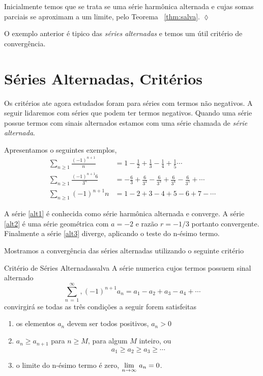 Inicialmente temos que se trata se uma s\'{e}rie harm\^{o}nica alternada e
cujas somas parciais se aproximam a um limite, pelo Teorema
~\ref{thm:salva}. \hfill \(\lozenge\)


O exemplo anterior \'{e} tipico das \textit{s\'{e}ries alternadas} e temos
um \'{u}til crit\'{e}rio de  converg\^{e}ncia.

\section{S\'{e}ries Alternadas, Crit\'{e}rios}

Os crit\'{e}rios ate agora estudados foram para s\'{e}ries com termos n\~{a}o
negativos. A seguir lidaremos com s\'{e}ries que podem ter termos
negativos. Quando uma s\'{e}rie possue termos com sinais alternados
estamos com uma s\'{e}rie chamada de \emph{s\'{e}rie alternada}.

Apresentamos o seguintes exemplos,
\begin{align}
\sum_{n\geq 1}\frac{(-1)^{n+1}}{n}&=1-\frac{1}{2}+\frac{1}{3}-\frac{1}{4}+\frac{1}{5}\cdots\label{alt1}\\[2ex]
\sum_{n\geq 1}\frac{(-1)^{n+1}6}{3^n}&=-\frac{6}{3}+\frac{6}{3^2}-\frac{6}{3^3}+\frac{6}{3^4}-\frac{6}{3^5}
+\cdots\label{alt2}\\[2ex]
\sum_{n\geq 1}(-1)^{n+1}n&=1-2+3-4+5-6+7-\cdots\label{alt3}
\end{align}

A s\'{e}rie \eqref{alt1} \'{e} conhecida como s\'{e}rie harm\^{o}nica alternada e
converge. A s\'{e}rie \eqref{alt2} \'{e} uma s\'{e}rie geom\'{e}trica com $a=-2$ e
raz\~{a}o $r=-1/3$ portanto convergente. Finalmente a s\'{e}rie \eqref{alt3}
diverge, aplicando o teste do n-\'{e}simo termo.

Mostramos a converg\^{e}ncia das s\'{e}ries alternadas utilizando o seguinte
crit\'{e}rio

\begin{theoc}{Crit\'{e}rio de S\'{e}ries Alternadas}{salva}
A s\'{e}rie numerica cujos termos possuem sinal alternado
 \begin{equation*}
 \sum_{n\,=\, 1}^{\infty},(-1)^{n+1}a_{n}=a_1-a_2+a_3-a_4+\cdots
 \end{equation*}
convirgir\'{a} se todas as tr\^{e}s condi\c{c}\~{o}es a seguir forem satisfeitas
\begin{enumerate}[label=\rm{(\alph*)},leftmargin=4em,ref=\rm{(\alph*)}]
\item os elementos $a_n$ devem ser todos positivos, $a_n>0$
\item $a_n\geq a_{n+1}$ para $n\geq M$, para algum $M$ inteiro,
ou
\begin{equation*}
a_1\geq a_2\geq a_3 \geq\cdots
\end{equation*}
\item  o limite do n-\'{e}simo termo \'{e} zero, $\displaystyle{\lim_{n\to\infty}\,a_n=0}$.
\end{enumerate}
\end{theoc}


